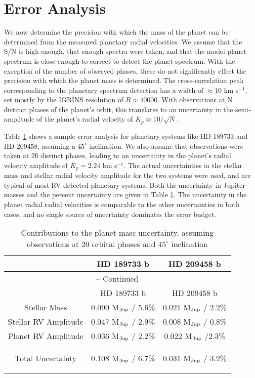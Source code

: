 \documentclass[11pt]{report}     %
\begin{document}
\section{Error Analysis}
\label{sec:error}
We now determine the precision with which the mass of the planet can be determined from the measured planetary radial velocities. We assume that the S/N is high enough, that enough spectra were taken, and that the model planet spectrum is close enough to correct to detect the planet spectrum. With the exception of the number of observed phases, these do not significantly effect the precision with which the planet mass is determined. The cross-correlation peak corresponding to the planetary spectrum detection has a width of $\approx 10$ km s$^{-1}$, set mostly by the IGRINS resolution of $R\approx 40000$. With observations at N distinct phases of the planet's orbit, this translates to an uncertainty in the semi-amplitude of the planet's radial velocity of $K_p \approx 10/\sqrt{N}$. 

Table \ref{tab:error} shows a sample error analysis for planetary systems like HD 189733 and HD 209458, assuming a $45^{\circ}$ inclination. We also assume that observations were taken at 20 distinct phases, leading to an uncertainty in the planet's radial velocity amplitude of $K_p = 2.24$ km s$^{-1}$. The actual uncertainties in the stellar mass and stellar radial velocity amplitude for the two systems were used, and are typical of most RV-detected planetary systems. Both the uncertainty in Jupiter masses and the percent uncertainty are given in Table \ref{tab:error}. The uncertainty in the planet radial radial velocities is comparable to the other uncertainties in both cases, and no single source of uncertainty dominates the error budget.


\begin{center}
\begin{longtable}{|ccc|}

\caption{Contributions to the planet mass uncertainty, assuming observations at 20 orbital phases and $45^{\circ}$ inclination} \\
\hline
 & HD 189733 b & HD 209458 b \\ \hline
\endfirsthead

\multicolumn{3}{c}{{\tablename} \thetable{} -- Continued} \\
\hline
 & HD 189733 b & HD 209458 b \\ \hline
\endhead

\hline
\endfoot

\hline
\endlastfoot

Stellar Mass & 0.090 M$_{\rm Jup}$ / 5.6\% & 0.021 M$_{\rm Jup}$ / 2.2\% \\
Stellar RV Amplitude & 0.047 M$_{\rm Jup}$ / 2.9\% & 0.008 M$_{\rm Jup}$ / 0.8\% \\
Planet RV Amplitude & 0.036 M$_{\rm Jup}$ / 2.2\% & 0.022 M$_{\rm Jup}$ /2.3\% \\
Total Uncertainty & 0.108 M$_{\rm Jup}$ / 6.7\% & 0.031 M$_{\rm Jup}$ / 3.2\%
 
\label{tab:error}
\end{longtable}
\end{center}
\end{document}

